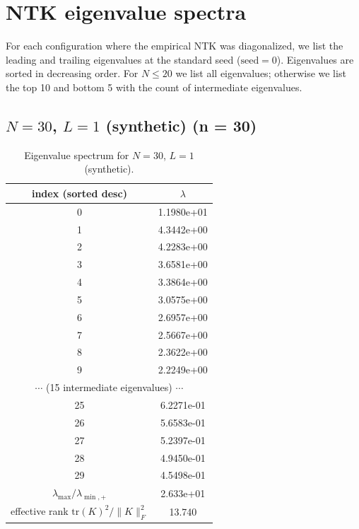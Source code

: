 \section{NTK eigenvalue spectra}
\label{app:eigvals}

For each configuration where the empirical NTK was diagonalized, we list the leading and trailing eigenvalues at the standard seed ($\text{seed}=0$). Eigenvalues are sorted in decreasing order. For $N \le 20$ we list all eigenvalues; otherwise we list the top 10 and bottom 5 with the count of intermediate eigenvalues.

\subsection*{$N=30$, $L=1$ (synthetic) \quad (n = 30)}
\begin{table}[H]
\centering
\caption{Eigenvalue spectrum for $N=30$, $L=1$ (synthetic).}
\begin{tabular}{c c}
\toprule
index (sorted desc) & $\lambda$ \\
\midrule
0 & 1.1980e+01 \\
1 & 4.3442e+00 \\
2 & 4.2283e+00 \\
3 & 3.6581e+00 \\
4 & 3.3864e+00 \\
5 & 3.0575e+00 \\
6 & 2.6957e+00 \\
7 & 2.5667e+00 \\
8 & 2.3622e+00 \\
9 & 2.2249e+00 \\
\multicolumn{2}{c}{$\cdots$ (15 intermediate eigenvalues) $\cdots$} \\
25 & 6.2271e-01 \\
26 & 5.6583e-01 \\
27 & 5.2397e-01 \\
28 & 4.9450e-01 \\
29 & 4.5498e-01 \\
\midrule
$\lambda_{\max}/\lambda_{\min, +}$ & 2.633e+01 \\
effective rank $\mathrm{tr}(K)^2/\|K\|_F^2$ & 13.740 \\
\bottomrule
\end{tabular}
\end{table}

